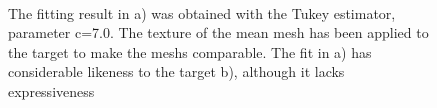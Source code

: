 \begin{figure}[h!]
\centering
{}\\
\label{fig:fitcomparison}
\caption{The fitting result in a) was obtained with the Tukey estimator, parameter c=7.0. The texture of the mean mesh has been applied to the target to make the meshs comparable. The fit in a) has considerable likeness to the target b), although it lacks expressiveness}
\end{figure}
